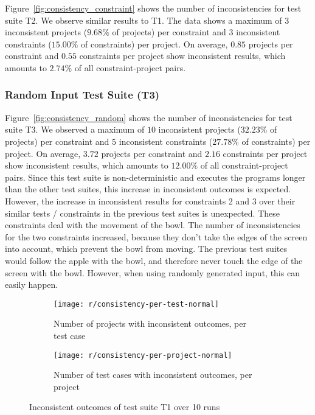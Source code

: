 Figure~\ref{fig:consistency_constraint} shows the number of inconsistencies for test suite T2.
We observe similar results to T1.
The data shows a maximum of $3$ inconsistent projects ($9.68\%$ of projects) per constraint and $3$ inconsistent constraints ($15.00\%$ of constraints) per project.
On average, $0.85$ projects per constraint and $0.55$ constraints per project show inconsistent results,
which amounts to $2.74\%$ of all constraint-project pairs.

\subsubsection{Random Input Test Suite (T3)}

Figure~\ref{fig:consistency_random} shows the number of inconsistencies for test suite T3.
We observed a maximum of $10$ inconsistent projects ($32.23\%$ of projects) per constraint and $5$ inconsistent constraints ($27.78\%$ of constraints) per project.
On average, $3.72$ projects per constraint and $2.16$ constraints per project show inconsistent results,
which amounts to $12.00\%$ of all constraint-project pairs.
Since this test suite is non-deterministic and executes the programs longer than the other test suites,
this increase in inconsistent outcomes is expected.
However, the increase in inconsistent results for constraints 2 and 3 over their similar tests / constraints in the previous test suites is unexpected.
These constraints deal with the movement of the bowl.
The number of inconsistencies for the two constraints increased, because they don't take the edges of the screen into account, which prevent the bowl from moving.
The previous test suites would follow the apple with the bowl, and therefore never touch the edge of the screen with the bowl.
However, when using randomly generated input, this can easily happen.

\begin{figure}[htpb]
    \centering
    \begin{subfigure}{.75\textwidth}
        \texttt{[image: r/consistency-per-test-normal]}%
        \vspace{-\medskipamount}
        \caption{Number of projects with inconsistent outcomes, per test case}
        \label{fig:consistency_per_test_normal}
    \end{subfigure}

    \bigskip

    \begin{subfigure}{.75\textwidth}
        \texttt{[image: r/consistency-per-project-normal]}%
        \vspace{-\medskipamount}
        \caption{Number of test cases with inconsistent outcomes, per project}
        \label{fig:consistency_per_project_normal}
    \end{subfigure}

    \caption{Inconsistent outcomes of test suite T1 over 10 runs}
    \label{fig:consistency_normal}
\end{figure}

